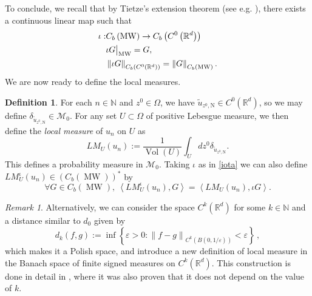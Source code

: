 \documentclass{amsart}
\theoremstyle{definition}
\newtheorem{definition}[theorem]{Definition}
\theoremstyle{remark}
\newtheorem{remark}[theorem]{Remark}
\newcommand{\ep}{\varepsilon}
\def\RR{\mathbb{R}}
\DeclareMathOperator\Vol{Vol} \DeclareMathOperator\GL{GL} \DeclareMathOperator\orto{O}
\numberwithin{equation}{section}
\theoremstyle{definition}
\theoremstyle{remark}
\def\RR{\mathbb{R}}
\DeclareMathOperator\MW{MW}
\newcommand\restr[2]{{%
		\left.\kern-\nulldelimiterspace 
		#1 
		\vphantom{\big|} 
		\right|_{#2} }}
\newcommand{\LM}{LM}
\newcommand\dk{d_{k}}
\begin{document}
	To conclude, we recall that by Tietze's extension theorem (see e.g. \cite[\S5]{Tie}), there exists a continuous linear map such that \begin{equation}\label{iota}
	\begin{aligned}
			\iota:& C_b\left(\MW\right)\rightarrow C_b\left(C^0\left(\RR^d\right)\right)\\&\restr{\iota G}{\MW} =G,\\&\left\|\iota G\right\|_{C_b\left(C^0\left(\RR^d\right)\right)}=\left\|G\right\|_{C_b\left(\MW\right)}.
	\end{aligned}
	\end{equation}
We are now ready to define the local measures.
\begin{definition}
	For each $n\in\mathbb{N}$ and $z^0\in\Omega$, we have $\tilde{u}_{z^0,\mathrm{N}}\in C^0\left(\RR^d\right)$, so we may define $\delta_{\tilde{u}_{z^0,\mathrm{N}}}\in\mathcal{M}_0$. For any set $U\subset\Omega$ of positive Lebesgue measure, we then define the \emph{local measure} of $u_n$ on $U$ as \begin{equation}
		\LM_{U}(u_n):=\frac{1}{\Vol(U)}\int_Udz^0\delta_{\tilde{u}_{z^0,\mathrm{N}}}.
	\end{equation}This defines a probability measure in $\mathcal{M}_0$. Taking $\iota$ as in \eqref{iota} we can also define $\LM_{U}^{\iota}(u_n)\in \left(C_b(\MW)\right)^*$ by
	\begin{equation}
		\forall G\in C_b(\MW),\ \left\langle\LM_{U}^{\iota}(u_n),G\right\rangle=\left\langle\LM_{U}(u_n),\iota G\right\rangle.
	\end{equation}
\end{definition}
\begin{remark}
	Alternatively, we can consider the space $C^k\left(\RR^d\right)$ for some $k\in\mathbb{N}$ and a distance similar to $d_0$ given by\begin{equation}
		\dk(f,g):=\inf\left\{\ep>0: \left\|f-g\right\|_{C^k\left(B\left(0,1/\ep\right)\right)}<\ep\right\}\,,\end{equation}which makes it a Polish space, and introduce a new definition of local measure in the Banach space of finite signed measures on $C^k\left(\RR^d\right)$. This construction is done in detail in \cite{Ingremeau}, where it was also proven that it does not depend on the value of $k$. 
		\end{remark}
\end{document}
